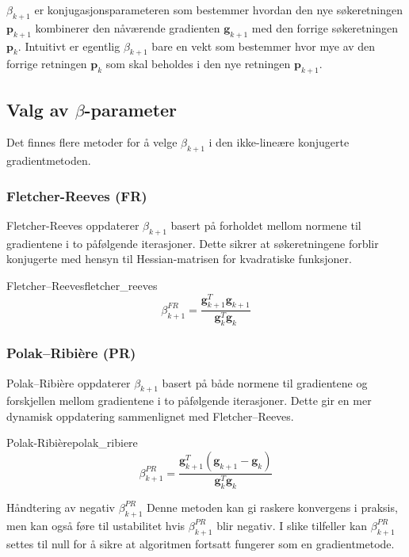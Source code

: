 \(\beta_{k+1}\) er konjugasjonsparameteren som bestemmer hvordan den nye søkeretningen \(\symbf{p}_{k+1}\) kombinerer den nåværende gradienten \(\symbf{g}_{k+1}\) med den forrige søkeretningen \(\symbf{p}_k\).
Intuitivt er egentlig \(\beta_{k+1}\) bare en vekt som bestemmer hvor mye av den forrige retningen \(\symbf{p}_k\) som skal beholdes i den nye retningen \(\symbf{p}_{k+1}\).

\subsection{Valg av \texorpdfstring{\(\beta\)}{beta}-parameter}
Det finnes flere metoder for å velge \(\beta_{k+1}\) i den ikke-lineære konjugerte gradientmetoden.

\subsubsection{Fletcher-Reeves (FR)}
Fletcher-Reeves oppdaterer \(\beta_{k+1}\) basert på forholdet mellom normene til gradientene i to påfølgende iterasjoner.
Dette sikrer at søkeretningene forblir konjugerte med hensyn til Hessian-matrisen for kvadratiske funksjoner.

\begin{definition}{Fletcher--Reeves}{fletcher_reeves}
	\[
		\beta_{k+1}^{FR} = \frac{\symbf{g}_{k+1}^T\symbf{g}_{k+1}}{\symbf{g}_k^T\symbf{g}_k} \tag{FR}
	\]
\end{definition}

\subsubsection{Polak--Ribière (PR)}
Polak--Ribière oppdaterer \(\beta_{k+1}\) basert på både normene til gradientene og forskjellen mellom gradientene i to påfølgende iterasjoner. Dette gir en mer dynamisk oppdatering sammenlignet med Fletcher--Reeves.
\begin{definition}{Polak-Ribière}{polak_ribiere}
	\[
		\beta_{k+1}^{PR} = \frac{\symbf{g}_{k+1}^T(\symbf{g}_{k+1}-\symbf{g}_k)}{\symbf{g}_k^T\symbf{g}_k} \tag{PR}
	\]
\end{definition}


\begin{remark}{Håndtering av negativ \(\beta_{k+1}^{PR}\)}{}
	Denne metoden kan gi raskere konvergens i praksis, men kan også føre til ustabilitet hvis \(\beta_{k+1}^{PR}\) blir negativ.
	I slike tilfeller kan \(\beta_{k+1}^{PR}\) settes til null for å sikre at algoritmen fortsatt fungerer som en gradientmetode.
\end{remark}

